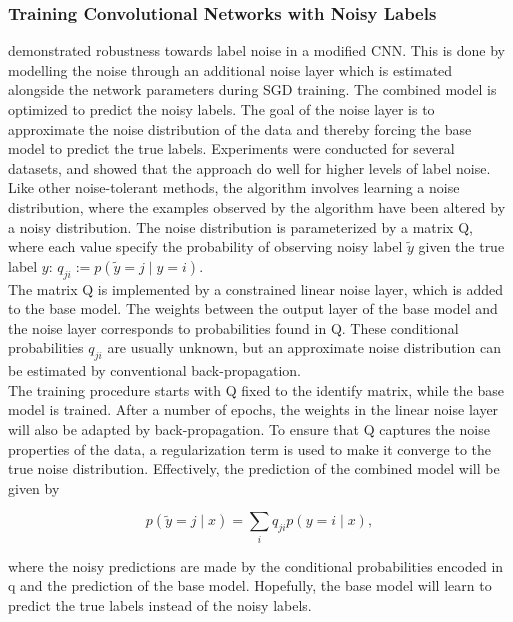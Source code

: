 \subsubsection{Training Convolutional Networks with Noisy Labels}
\cite{Sukhbaatar_noisy_network_learning} demonstrated robustness towards label noise in a modified \ac{CNN}. This is done by modelling the noise through an additional noise layer which is estimated alongside the network parameters during \ac{SGD} training. The combined model is optimized to predict the noisy labels. The goal of the noise layer is to approximate the noise distribution of the data and thereby forcing the base model to predict the true labels. Experiments were conducted for several datasets, and showed that the approach do well for higher levels of label noise. \\

Like other noise-tolerant methods, the algorithm involves learning a noise distribution, where the examples observed by the algorithm have been altered by a noisy distribution. The noise distribution is parameterized by a matrix Q, where each value specify the probability of observing noisy label $\tilde{y}$ given the true label $y$: $q_{ji} := p(\tilde{y} = j \mid y = i)$. \\

The matrix Q is implemented by a constrained linear noise layer, which is added to the base model. The weights between the output layer of the base model and the noise layer corresponds to probabilities found in Q. These conditional probabilities $q_{ji}$ are usually unknown, but an approximate noise distribution can be estimated by conventional back-propagation. \\

The training procedure starts with Q fixed to the identify matrix, while the base model is trained. After a number of epochs, the weights in the linear noise layer will also be adapted by back-propagation. To ensure that Q captures the noise properties of the data, a regularization term is used to make it converge to the true noise distribution. Effectively, the prediction of the combined model will be given by

$$p(\tilde{y} = j \mid x) = \sum_{i} q_{ji}p(y = i \mid x),$$ 

where the noisy predictions are made by the conditional probabilities encoded in q and the prediction of the base model. Hopefully, the base model will learn to predict the true labels instead of the noisy labels.  \\

